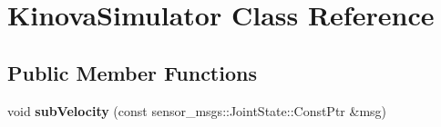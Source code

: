\hypertarget{class_kinova_simulator}{}\section{Kinova\+Simulator Class Reference}
\label{class_kinova_simulator}
\subsection*{Public Member Functions}
\begin{DoxyCompactItemize}
\item 
void {\bfseries sub\+Velocity} (const sensor\+\_\+msgs\+::\+Joint\+State\+::\+Const\+Ptr \&msg)\hypertarget{class_kinova_simulator_a9c2ca8000c94cc21fdf3018b4435f552}{}\label{class_kinova_simulator_a9c2ca8000c94cc21fdf3018b4435f552}

\end{DoxyCompactItemize}
